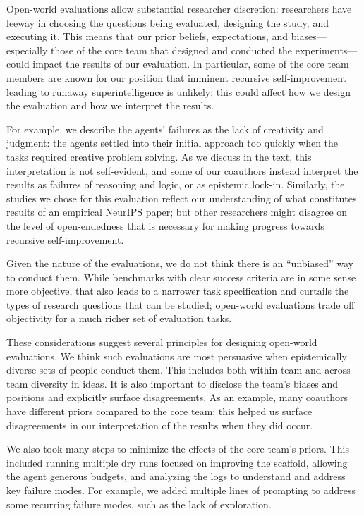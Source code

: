 Open-world evaluations allow substantial researcher discretion:
researchers have leeway in choosing the questions being evaluated, designing
the study, and executing it. This means that our prior beliefs, expectations,
and biases---especially those of the core team that designed and conducted the
experiments---could impact the results of our evaluation. In particular, some
of the core team members are known for our position that imminent recursive
self-improvement leading to runaway superintelligence is unlikely; this could
affect how we design the evaluation and how we interpret the results.

For example, we describe the agents' failures as the lack of creativity and
judgment: the agents settled into their initial approach too quickly when the
tasks required creative problem solving. As we discuss in the text, this
interpretation is not self-evident, and some of our coauthors instead interpret
the results as failures of reasoning and logic, or as epistemic lock-in.
Similarly, the studies we chose for this evaluation reflect our understanding
of what constitutes results of an empirical NeurIPS paper; but other
researchers might disagree on the level of open-endedness that is necessary
for making progress towards recursive self-improvement.

Given the nature of the evaluations, we do not think there is an ``unbiased''
way to conduct them. While benchmarks with clear success criteria are in some
sense more objective, that also leads to a narrower task specification and
curtails the types of research questions that can be studied; open-world
evaluations trade off objectivity for a much richer set of evaluation tasks.

These considerations suggest several principles for designing open-world evaluations. We think such evaluations are most persuasive when epistemically diverse sets of people conduct them. This includes both within-team and across-team diversity in ideas. It is also important to disclose the team's biases and positions and explicitly surface disagreements. As an example, many coauthors have different priors compared to the core team; this helped us surface disagreements in our interpretation of the results when they did occur.

We also took many steps to minimize the effects of the core team's priors.
This included running multiple dry runs focused on improving the scaffold,
allowing the agent generous budgets, and analyzing the logs to understand and
address key failure modes. For example, we added multiple lines of prompting
to address some recurring failure modes, such as the lack of exploration.


